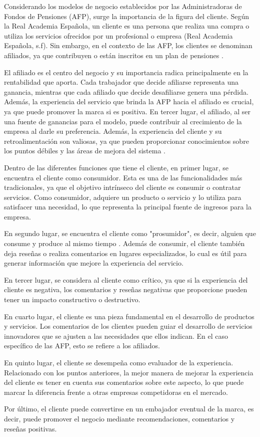 Considerando los modelos de negocio establecidos por las Administradoras de Fondos de Pensiones (AFP), surge la importancia de la figura del cliente. Según la Real Academia Española, un cliente es una persona que realiza una compra o utiliza los servicios ofrecidos por un profesional o empresa (Real Academia Española, s.f). Sin embargo, en el contexto de las AFP, los clientes se denominan afiliados, ya que contribuyen o están inscritos en un plan de pensiones \cite{pension-system}.

El afiliado es el centro del negocio y su importancia radica principalmente en la rentabilidad que aporta. Cada trabajador que decide afiliarse representa una ganancia, mientras que cada afiliado que decide desafiliarse genera una pérdida. Además, la experiencia del servicio que brinda la AFP hacia el afiliado es crucial, ya que puede promover la marca si es positiva. En tercer lugar, el afiliado, al ser una fuente de ganancias para el modelo, puede contribuir al crecimiento de la empresa al darle su preferencia. Además, la experiencia del cliente y su retroalimentación son valiosas, ya que pueden proporcionar conocimientos sobre los puntos débiles y las áreas de mejora del sistema \cite{def-cliente}.

Dentro de las diferentes funciones que tiene el cliente, en primer lugar, se encuentra el cliente como consumidor. Esta es una de las funcionalidades más tradicionales, ya que el objetivo intrínseco del cliente es consumir o contratar servicios. Como consumidor, adquiere un producto o servicio y lo utiliza para satisfacer una necesidad, lo que representa la principal fuente de ingresos para la empresa.

En segundo lugar, se encuentra el cliente como "prosumidor", es decir, alguien que consume y produce al mismo tiempo \cite{understand-roles}. Además de consumir, el cliente también deja reseñas o realiza comentarios en lugares especializados, lo cual es útil para generar información que mejore la experiencia del servicio.

En tercer lugar, se considera al cliente como crítico, ya que si la experiencia del cliente es negativa, los comentarios y reseñas negativas que proporcione pueden tener un impacto constructivo o destructivo.

En cuarto lugar, el cliente es una pieza fundamental en el desarrollo de productos y servicios. Los comentarios de los clientes pueden guiar el desarrollo de servicios innovadores que se ajusten a las necesidades que ellos indican. En el caso específico de las AFP, esto se refiere a los afiliados.

En quinto lugar, el cliente se desempeña como evaluador de la experiencia. Relacionado con los puntos anteriores, la mejor manera de mejorar la experiencia del cliente es tener en cuenta sus comentarios sobre este aspecto, lo que puede marcar la diferencia frente a otras empresas competidoras en el mercado.

Por último, el cliente puede convertirse en un embajador eventual de la marca, es decir, puede promover el negocio mediante recomendaciones, comentarios y reseñas positivas.